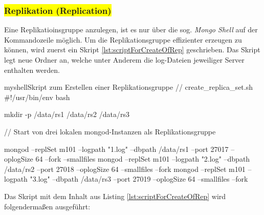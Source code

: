 \subsubsection{\colorbox{yellow}{Replikation (Replication)}}

Eine Replikatioinsgruppe anzulegen, ist es nur über die sog. \textit{Mongo Shell} auf der Kommandozeile möglich. Um die Replikationsgruppe effizienter erzeugen zu können, wird zuerst ein Skript \ref{lst:scriptForCreateOfRep} geschrieben. Das Skript legt neue Ordner an, welche unter Anderem die log-Dateien jeweiliger Server enthalten werden.

\begin{listingsboxShell}[label={lst:scriptForCreateOfRep}]{myshell}{Skript zum Erstellen einer Replikationsgruppe}
// create_replica_set.sh
#!/usr/bin/env bash

mkdir -p /data/rs1 /data/rs2 /data/rs3

// Start von drei lokalen mongod-Instanzen als Replikationsgruppe

mongod --replSet m101 --logpath "1.log" --dbpath /data/rs1 --port 27017
--oplogSize 64 --fork --smallfiles
mongod --replSet m101 --logpath "2.log" --dbpath /data/rs2 --port 27018
--oplogSize 64 --smallfiles --fork
mongod --replSet m101 --logpath "3.log" --dbpath /data/rs3 --port 27019
--oplogSize 64 --smallfiles --fork
\end{listingsboxShell}

Das Skript mit dem Inhalt aus Listing \ref{lst:scriptForCreateOfRep} wird folgendermaßen ausgeführt:


%

